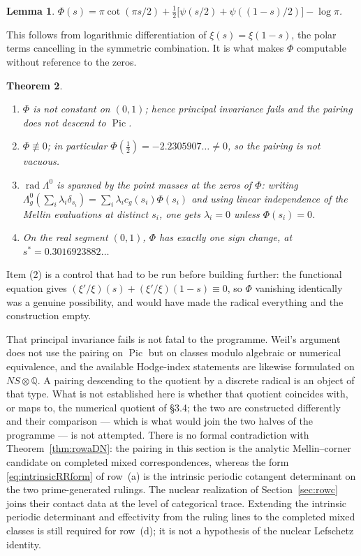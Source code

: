 \documentclass[11pt]{amsart}
\newtheorem{theorem}{Theorem}[section]
\newtheorem{lemma}[theorem]{Lemma}
\theoremstyle{definition}
\theoremstyle{remark}
\newcommand{\Q}{\mathbb Q}
\begin{document}
\begin{lemma}\label{lem:phipsi}
$\Phi(s)=\pi\cot(\pi s/2)+\tfrac12\big[\psi(s/2)+\psi((1-s)/2)\big]-\log\pi$.
\end{lemma}

This follows from logarithmic differentiation of $\xi(s)=\xi(1-s)$, the polar
terms cancelling in the symmetric combination.  It is what makes $\Phi$
computable without reference to the zeros.

\begin{theorem}\label{thm:principalradical}
\begin{enumerate}
\item $\Phi$ is not constant on $(0,1)$; hence principal invariance fails
and the pairing does not descend to $\operatorname{Pic}$.
\item $\Phi\not\equiv0$; in particular $\Phi(\tfrac12)=-2.2305907\ldots\ne0$,
so the pairing is not vacuous.
\item $\operatorname{rad}\Lambda^{0}$ is spanned by the point masses at the
zeros of $\Phi$: writing
$\Lambda_g^{0}(\sum_i\lambda_i\delta_{s_i})=\sum_i\lambda_ic_g(s_i)\Phi(s_i)$
and using linear independence of the Mellin evaluations at distinct $s_i$,
one gets $\lambda_i=0$ unless $\Phi(s_i)=0$.
\item On the real segment $(0,1)$, $\Phi$ has exactly one sign change, at
$s^{\ast}=0.3016923882\ldots$
\end{enumerate}
\end{theorem}

Item (2) is a control that had to be run before building further: the
functional equation gives $(\xi'/\xi)(s)+(\xi'/\xi)(1-s)\equiv0$, so
$\Phi$ vanishing identically was a genuine possibility, and would have made
the radical everything and the construction empty.

That principal invariance fails is not fatal to the programme.  Weil's
argument does not use the pairing on $\operatorname{Pic}$ but on classes
modulo algebraic or numerical equivalence, and the available Hodge-index
statements are likewise formulated on $NS\otimes\Q$.  A pairing descending to
the quotient by a discrete radical is an object of that type.  What is not
established here is whether that quotient coincides with, or maps to, the
numerical quotient of \S3.4; the two are constructed differently and their
comparison --- which is what would join the two halves of the programme ---
is not attempted.  There is no formal contradiction with
Theorem~\ref{thm:rowaDN}: the pairing in this section is the analytic
Mellin--corner candidate on completed mixed correspondences, whereas the
form \eqref{eq:intrinsicRRform} of row~(a) is the intrinsic periodic cotangent determinant on the two
prime-generated rulings.  The nuclear realization of
Section~\ref{sec:rowc} joins their contact data at the level of categorical
trace.  Extending the intrinsic periodic determinant and effectivity from
the ruling lines to the completed mixed classes is still required for
row~(d); it is not a hypothesis of the nuclear Lefschetz identity.
\end{document}

